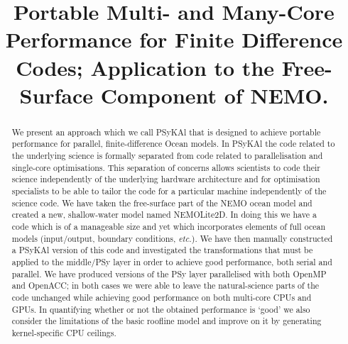 \documentclass[gmdd, manuscript]{copernicus}
\begin{document}
\title{Portable Multi- and Many-Core Performance for Finite Difference Codes;
  Application to the Free-Surface Component of NEMO.}







\received{}
\pubdiscuss{} %
\revised{}
\accepted{}
\published{}

\maketitle

\begin{abstract}

We present an approach which we call {PS}y{KA}l that is designed to achieve
portable performance for parallel, finite-difference Ocean models.  In
{PS}y{KA}l the code related to the underlying science is formally
separated from code related to parallelisation and single-core
optimisations. This separation of concerns allows scientists to code
their science independently of the underlying hardware architecture
and for optimisation specialists to be able to tailor the code for a
particular machine independently of the science code. We have taken
the free-surface part of the NEMO ocean model and created a new,
shallow-water model named NEMOLite2D. In doing this we have a code
which is of a manageable size and yet which incorporates elements of
full ocean models (input/output, boundary conditions, \textit{etc.}).
We have then manually constructed a {PS}y{KA}l version of this code and
investigated the transformations that must be applied to the
middle/PSy layer in order to achieve good performance, both serial and
parallel. We have produced versions of the PSy layer parallelised with
both OpenMP and OpenACC; in both cases we were able to leave the
natural-science parts of the code unchanged while achieving good
performance on both multi-core CPUs and GPUs. In quantifying whether
or not the obtained performance is `good' we also consider the
limitations of the basic roofline model and improve on it
by generating kernel-specific CPU ceilings.

\end{abstract}
\end{document}

